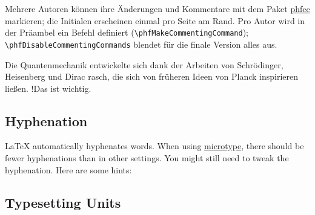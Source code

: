 \begin{ltgexample}




\end{ltgexample}


Mehrere Autoren können ihre Änderungen und Kommentare mit dem Paket \href{https://ctan.org/pkg/phfcc}{phfcc} markieren; die Initialen erscheinen einmal pro Seite am Rand.
Pro Autor wird in der Präambel ein Befehl definiert (\verb|\phfMakeCommentingCommand|); \verb|\phfDisableCommentingCommands| blendet für die finale Version alles aus.

\begin{ltgexample}
Die Quantenmechanik entwickelte sich dank der Arbeiten von Schrödinger, Heisenberg und Dirac rasch,
die sich von früheren Ideen von Planck   inspirieren ließen.
 \FA!{Das ist wichtig.}
\end{ltgexample}

\subsection{Hyphenation}

\LaTeX{} automatically hyphenates words.
When using \href{https://ctan.org/pkg/microtype}{microtype}, there should be fewer hyphenations than in other settings.
You might still need to tweak the hyphenation.
Here are some hints:


\subsection{Typesetting Units}

